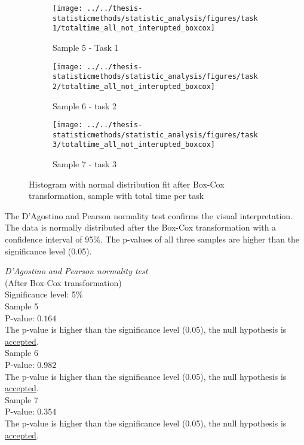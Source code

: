 \begin{figure}[h!]
	\centering
	\begin{subfigure}[b]{0.3\textwidth}
		\centering
		\texttt{[image: ../../thesis-statisticmethods/statistic\_analysis/figures/task1/totaltime\_all\_not\_interupted\_boxcox]}
		\caption{Sample 5 - Task 1}
		\label{fig:totaltimeallnotinteruptedboxcox_task1}
	\end{subfigure}
	\begin{subfigure}[b]{0.3\textwidth}
		\centering
		\texttt{[image: ../../thesis-statisticmethods/statistic\_analysis/figures/task2/totaltime\_all\_not\_interupted\_boxcox]}
		\caption{Sample 6 - task 2}
		\label{fig:totaltimeallnotinteruptedboxcox_task2}
	\end{subfigure}
	\begin{subfigure}[b]{0.3\textwidth}
		\centering
		\texttt{[image: ../../thesis-statisticmethods/statistic\_analysis/figures/task3/totaltime\_all\_not\_interupted\_boxcox]}
		\caption{Sample 7 - task 3}
		\label{fig:totaltimeallnotinteruptedboxcox_task3}
	\end{subfigure}
	\caption{Histogram with normal distribution fit after Box-Cox transformation, sample with total time per task}
\end{figure}

The D'Agostino and Pearson normality test confirms the visual interpretation. The data is normally distributed after the Box-Cox transformation with a confidence interval of 95\%. The p-values of all three samples are higher than the significance level (0.05). \\[0.2cm]

\begin{center}
	\begin{tcolorbox}[width=0.8\textwidth]
		\centering
		\textit{D'Agostino and Pearson normality test}\\
		(After Box-Cox transformation)\\
		Significance level: 5\%  \\[0.5cm]
		
		Sample 5 \\
		P-value: $0.164$\\
		The p-value is higher than the significance level (0.05), the null hypothesis is \underline{accepted}. \\[0.5cm]
		
		Sample 6 \\
		P-value: $0.982$ \\
		The p-value is higher than the significance level (0.05), the null hypothesis is \underline{accepted}. \\[0.5cm]
		
		Sample 7 \\
		P-value: $0.354$ \\
		The p-value is higher than the significance level (0.05), the null hypothesis is \underline{accepted}. \\[0.5cm]
	\end{tcolorbox} 
\end{center}

